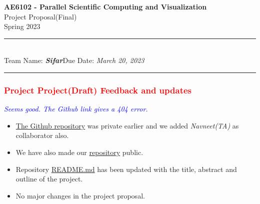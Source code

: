 \documentclass[11pt,a4paper]{article}
\newcommand{\student}{\textbf{\textit{Sifar}}}
\begin{document}
\thispagestyle{empty}
\begin{center}
	\textcolor{codepurple}{\bf\Large AE6102 - Parallel Scientific Computing and Visualization}\\
        \vspace*{0.2cm}
        \textcolor{codegray}{\Large Project Proposal(Final)}\\
        \vspace*{0.2cm}
	  \textcolor{codegray}{\large Spring 2023}
\end{center}
\noindent
\rule{19cm}{0.2cm}\\[0.3cm]
Team Name: \student \hfill Due Date: \textit{March 20, 2023}\\[0.1cm]
\rule{19cm}{0.05cm}
\vspace{0.1cm}

\vspace*{-0.5cm}

\subsubsection*{\textcolor{red}{Project Project(Draft) Feedback and updates}}
\textcolor{blue}{\textit{Seems good. The Github link gives a 404 error.}}
\begin{itemize}
    \item \href{https://github.com/rajagond/AE6102_sifar}{The Github repository} was private earlier and we added \textit{Navneet(TA)} as collaborator also.     
    \item We have also made our \href{https://github.com/rajagond/AE6102_sifar}{repository} public.
    \item Repository \href{https://github.com/rajagond/AE6102_sifar/blob/main/README.md}{README.md} has been updated with the title, abstract and outline of the project.
    \item No major changes in the project proposal.
\end{itemize}
\end{document}
